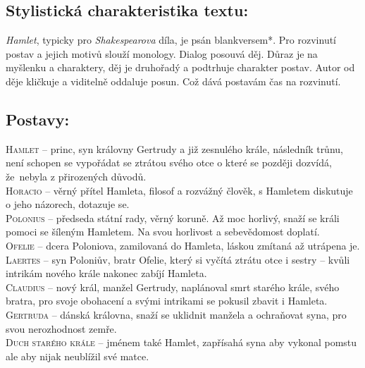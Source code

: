 \documentclass[A4paper]{extarticle} %
\begin{document}


\subsection*{Stylistická charakteristika textu: }
\noindent\textit{Hamlet}, typicky pro \textit{Shakespearova} díla, je psán blankversem*.
Pro rozvinutí postav a jejich motivů slouží monology.
Dialog posouvá děj.
Důraz je na myšlenku a charaktery, děj je druhořadý a podtrhuje charakter postav.
Autor od děje kličkuje a viditelně oddaluje posun.
Což dává postavám čas na rozvinutí.

\subsection*{Postavy:}
\noindent 
\textsc{Hamlet --} princ, syn královny Gertrudy a již zesnulého krále,
následník trůnu, není schopen se vypořádat se ztrátou svého otce o které se později dozvídá,
že~nebyla z přirozených důvodů. \\
\textsc{Horacio --} věrný přítel Hamleta, filosof a rozvážný člověk,
s Hamletem diskutuje o jeho názorech, dotazuje se. \\
\textsc{Polonius --} předseda státní rady, věrný koruně. Až moc horlivý,
snaží se králi pomoci se šíleným Hamletem. Na svou horlivost a sebevědomost doplatí. \\
\textsc{Ofelie --} dcera Poloniova, zamilovaná do Hamleta, láskou zmítaná až utrápena je. \\
\textsc{Laertes --} syn Poloniův, bratr Ofelie, který si vyčítá ztrátu otce i sestry
-- kvůli intrikám nového krále nakonec zabíjí Hamleta. \\
\textsc{Claudius --} nový král, manžel Gertrudy, naplánoval smrt starého krále,
svého bratra, pro svoje obohacení a svými intrikami se pokusil zbavit i Hamleta. \\
\textsc{Gertruda --} dánská královna, snaží se uklidnit manžela a ochraňovat syna,
pro svou nerozhodnost zemře. \\
\textsc{Duch starého krále --} jménem také Hamlet,
zapřísahá syna aby vykonal pomstu ale aby nijak neublížil své matce.
\end{document}
